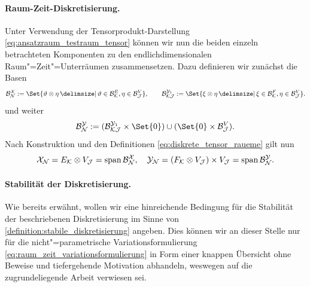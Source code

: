 \documentclass[../main.tex]{subfiles}
\begin{document}
\paragraph{Raum-Zeit-Diskretisierung.} %
\label{par:raum_zeit_diskretisierung}

Unter Verwendung der Tensorprodukt-Darstellung \cref{eq:ansatzraum_testraum_tensor} können wir nun die beiden einzeln betrachteten Komponenten zu den endlichdimensionalen Raum"=Zeit"=Unterräumen zusammensetzen.
Dazu definieren wir zunächst die Basen
\begin{equation}
\label{eq:diskreter_ansatzraum_basis_phi}
\label{eq:diskreter_testraum_basis_psi1}
    \mathcal B^{\mathcal X}_{\mathcal N} := \Set{\theta \otimes \eta \given \theta \in \mathcal B^{E}_{\mathcal K}, \eta \in \mathcal B^{V}_{\mathcal J}},
    \qquad
    \mathcal B^{\mathcal Y_{1}}_{\mathcal K \mathcal J} := \Set{\xi \otimes \eta \given \xi \in \mathcal B^{F}_{\mathcal K}, \eta \in \mathcal B^{V}_{\mathcal J}}.
\end{equation}
und weiter
\begin{equation}
\label{eq:diskreter_testraum_basis_psi}
    \mathcal B^{\mathcal Y}_{\mathcal N} := (\mathcal B^{\mathcal Y_{1}}_{\mathcal K \mathcal J} \times \Set{ 0 }) \cup (\Set{0} \times \mathcal B^{V}_{\mathcal J}).
\end{equation}
Nach Konstruktion und den Definitionen \cref{eq:diskrete_tensor_raueme} gilt nun
\begin{equation}
    \label{eq:diskreter_ansatz_und_testraum_als_span}
    \mathcal X_{\mathcal N} = E_{\mathcal K} \otimes V_{\mathcal J} = \operatorname{span} \mathcal B^{\mathcal X}_{\mathcal N},
    \quad
    \mathcal Y_{\mathcal N} = (F_{\mathcal K} \otimes V_{\mathcal J}) \times V_{\mathcal J} = \operatorname{span} \mathcal B^{\mathcal Y}_{\mathcal N}.
\end{equation}


\paragraph{Stabilität der Diskretisierung.} %
\label{par:stabilit_t_der_diskretisierung}

Wie bereits erwähnt, wollen wir eine hinreichende Bedingung für die Stabilität der beschriebenen Diskretisierung im Sinne von \cref{definition:stabile_diskretisierung} angeben.
Dies können wir an dieser Stelle nur für die nicht"=parametrische Variationsformulierung \cref{eq:raum_zeit_variationsformulierung} in Form einer knappen Übersicht ohne Beweise und tiefergehende Motivation abhandeln, weswegen auf die zugrundeliegende Arbeit \cite[Section 5.2]{Andreev:2012ep} verwiesen sei.
\end{document}
